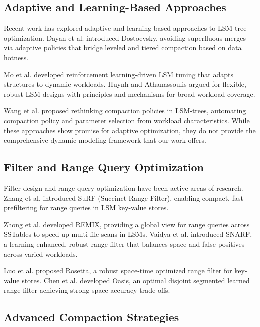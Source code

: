 \documentclass[11pt]{article}
\begin{document}
\subsection{Adaptive and Learning-Based Approaches}

Recent work has explored adaptive and learning-based approaches to LSM-tree optimization. Dayan et al. \cite{dayan2018dostoevsky} introduced Dostoevsky, avoiding superfluous merges via adaptive policies that bridge leveled and tiered compaction based on data hotness.

Mo et al. \cite{mo2023ruskey} developed reinforcement learning-driven LSM tuning that adapts structures to dynamic workloads. Huynh and Athanassoulis \cite{huynh2024klsm} argued for flexible, robust LSM designs with principles and mechanisms for broad workload coverage.

Wang et al. \cite{wang2025ecotune} proposed rethinking compaction policies in LSM-trees, automating compaction policy and parameter selection from workload characteristics. While these approaches show promise for adaptive optimization, they do not provide the comprehensive dynamic modeling framework that our work offers.

\subsection{Filter and Range Query Optimization}

Filter design and range query optimization have been active areas of research. Zhang et al. \cite{zhang2018surf} introduced SuRF (Succinct Range Filter), enabling compact, fast prefiltering for range queries in LSM key-value stores.

Zhong et al. \cite{zhong2021remix} developed REMIX, providing a global view for range queries across SSTables to speed up multi-file scans in LSMs. Vaidya et al. \cite{vaidya2022snarf} introduced SNARF, a learning-enhanced, robust range filter that balances space and false positives across varied workloads.

Luo et al. \cite{rosetta2020} proposed Rosetta, a robust space-time optimized range filter for key-value stores. Chen et al. \cite{chen2024oasis} developed Oasis, an optimal disjoint segmented learned range filter achieving strong space-accuracy trade-offs.

\subsection{Advanced Compaction Strategies}
\end{document}
